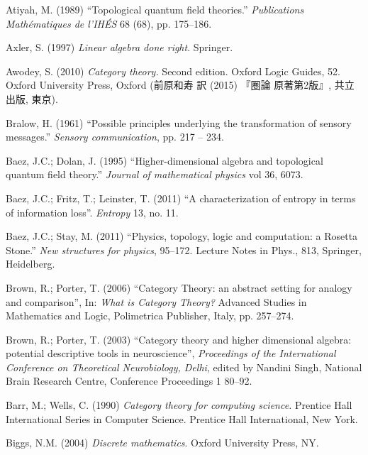 

\printindex



\begin{thebibliography}{SGWB}\rr

 Atiyah, M. (1989) ``Topological quantum field theories.'' \textit{Publications Math\'{e}matiques de l'IHÉS} 68 (68), pp. 175--186.

 Axler, S. (1997) \textit{Linear algebra done right}. Springer. 

 Awodey, S. (2010) \textit{Category theory.} Second edition. Oxford Logic Guides, 52. Oxford University Press, Oxford (前原和寿 訳 (2015) 『圏論 原著第2版』, 共立出版, 東京).

 Bralow, H. (1961) ``Possible principles underlying the transformation of sensory messages.'' \textit{Sensory communication}, pp. 217 -- 234.

 Baez, J.C.; Dolan, J. (1995) ``Higher-dimensional algebra and topological quantum field theory.'' \textit{Journal of mathematical physics} vol 36, 6073.

 Baez, J.C.; Fritz, T.; Leinster, T. (2011) ``A characterization of entropy in terms of information loss''. \textit{Entropy} 13, no. 11.

 Baez, J.C.; Stay, M. (2011) ``Physics, topology, logic and computation: a Rosetta Stone.'' \textit{New structures for physics}, 95--172. Lecture Notes in Phys., 813, Springer, Heidelberg.

 Brown, R.; Porter, T. (2006) ``Category Theory: an abstract setting for
analogy and comparison'', In: \textit{What is Category Theory?} Advanced
Studies in Mathematics and Logic, Polimetrica Publisher, Italy, pp. 257--274.

 Brown, R.; Porter, T. (2003) ``Category theory and higher dimensional
algebra: potential descriptive tools in neuroscience'', \textit{Proceedings
of the International Conference on Theoretical Neurobiology, Delhi}, edited by Nandini Singh, National Brain Research
Centre, Conference Proceedings 1 80--92. 

 Barr, M.; Wells, C.  (1990) \textit{Category theory for computing science.} Prentice Hall International Series in Computer Science. Prentice Hall International, New York.

 Biggs, N.M. (2004) \textit{Discrete mathematics}. Oxford University Press, NY. 


\end{thebibliography}
